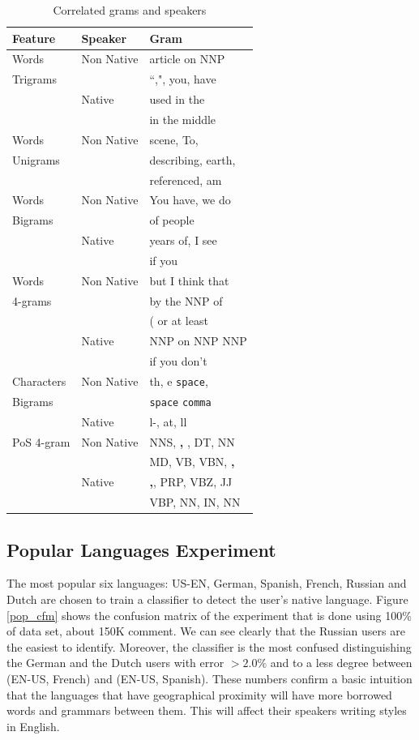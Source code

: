 \documentclass[11pt]{article}
\begin{document}
\begin{table}[htp]
\begin{tabular}{l|ll}
	Feature & Speaker  & Gram
	\\\hline
	Words & Non Native &article on NNP\\
	 Trigrams& & ``,", you, have\\
	 & Native& used in the\\
	 &  &in the middle\\\hline
	 
	Words &Non Native& scene, To,\\
	   Unigrams&&describing, earth,\\
	    && referenced, am\\\hline
	    
	Words 	&Non Native& You have, we do\\
	Bigrams&& of people\\
	&Native& years of, I see\\
	&&if you\\\hline

	Words &Non Native& but I think that\\
	4-grams	&&by the NNP of\\
		&&( or at least\\
		&Native&NNP on NNP NNP\\
		&&if you don't\\\hline

	Characters&Non Native& th, e \verb+space+,\\
	Bigrams && \verb+space+ \verb+comma+\\
	&Native& l-, at, ll\\\hline
	
	PoS 4-gram &Non Native& NNS, \textbf{,} , DT, NN\\
	&& MD, VB, VBN, \textbf{,}\\
	&Native& \textbf{,}, PRP, VBZ, JJ\\
	&& VBP, NN, IN, NN\\
	
\end{tabular}
\label{table:nonnative}
\caption{Correlated grams and speakers}
\end{table}


\subsection{Popular Languages Experiment}
The most popular six languages: US-EN, German, Spanish, French, Russian and Dutch  are chosen to train a classifier to detect the user's native language. Figure \ref{pop_cfm} shows the confusion matrix of the experiment that is done using 100\% of data set, about 150K comment. We can see clearly that the Russian users are the easiest to identify. Moreover, the classifier is the most confused distinguishing the German and the Dutch users with error $>2.0\%$ and to a less degree between (EN-US, French) and (EN-US, Spanish). These numbers confirm a basic intuition that the languages that have geographical proximity will have more borrowed words and grammars between them. This will affect their speakers writing styles in English.
\end{document}
